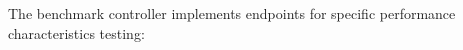 The benchmark controller implements endpoints for specific performance characteristics testing:

    
    
    
        
        
        
        
        
